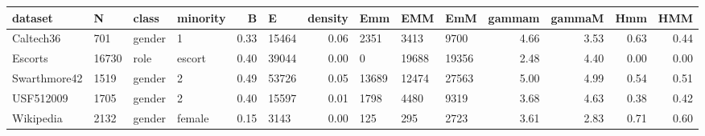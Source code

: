 \begin{tabular}{llllrlrlllrrrr}
\toprule
      dataset &      N &   class & minority &    B &      E &  density &    Emm &    EMM &    EmM &  gammam &  gammaM &  Hmm &  HMM \\
\midrule
    Caltech36 &    701 &  gender &        1 & 0.33 &  15464 &     0.06 &   2351 &   3413 &   9700 &    4.66 &    3.53 & 0.63 & 0.44 \\
      Escorts &  16730 &    role &   escort & 0.40 &  39044 &     0.00 &      0 &  19688 &  19356 &    2.48 &    4.40 & 0.00 & 0.00 \\
 Swarthmore42 &   1519 &  gender &        2 & 0.49 &  53726 &     0.05 &  13689 &  12474 &  27563 &    5.00 &    4.99 & 0.54 & 0.51 \\
    USF512009 &   1705 &  gender &        2 & 0.40 &  15597 &     0.01 &   1798 &   4480 &   9319 &    3.68 &    4.63 & 0.38 & 0.42 \\
    Wikipedia &   2132 &  gender &   female & 0.15 &   3143 &     0.00 &    125 &    295 &   2723 &    3.61 &    2.83 & 0.71 & 0.60 \\
\bottomrule
\end{tabular}
